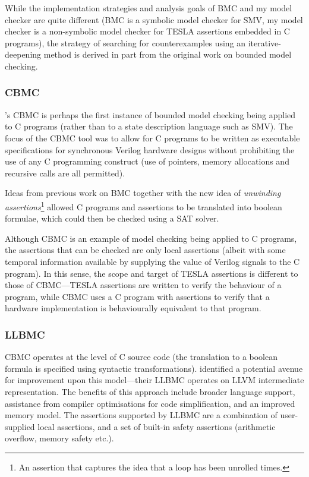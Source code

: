 While the implementation strategies and analysis goals of BMC and my
model checker are quite different (BMC is a symbolic model checker for
SMV, my model checker is a non-symbolic model checker for TESLA
assertions embedded in C programs), the strategy of searching for
counterexamples using an iterative-deepening method is derived in part
from the original work on bounded model checking.

\subsubsection{CBMC}

\citeauthor{clarke_behavioral_2003}'s CBMC \cite{clarke_behavioral_2003}
is perhaps the first instance of bounded model checking being applied to
C programs (rather than to a state description language such as SMV).
The focus of the CBMC tool was to allow for C programs to be written as
executable specifications for synchronous Verilog hardware designs
without prohibiting the use of any C programming construct (use of
pointers, memory allocations and recursive calls are all permitted).

Ideas from previous work on BMC together with the new idea of
\emph{unwinding assertions}\footnote{An assertion that captures the idea
that a loop has been unrolled  times.} allowed C
programs and assertions to be translated into boolean formulae, which
could then be checked using a SAT solver.

Although CBMC is an example of model checking being applied to C
programs, the assertions that can be checked are only local assertions
(albeit with some temporal information available by supplying the value
of Verilog signals to the C program). In this sense, the scope and
target of TESLA assertions is different to those of CBMC---TESLA
assertions are written to verify the behaviour of a program, while CBMC
uses a C program with assertions to verify that a hardware
implementation is behaviourally equivalent to that program.

\subsubsection{LLBMC}

CBMC operates at the level of C source code (the translation to a
boolean formula is specified using syntactic transformations).
\textcite{merz_llbmc:_2012} identified a potential avenue for
improvement upon this model---their LLBMC operates on LLVM
\cite{lattner_llvm:_2002} intermediate representation. The benefits of
this approach include broader language support, assistance from compiler
optimisations for code simplification, and an improved memory model. The
assertions supported by LLBMC are a combination of user-supplied local
assertions, and a set of built-in safety assertions (arithmetic
overflow, memory safety etc.).

